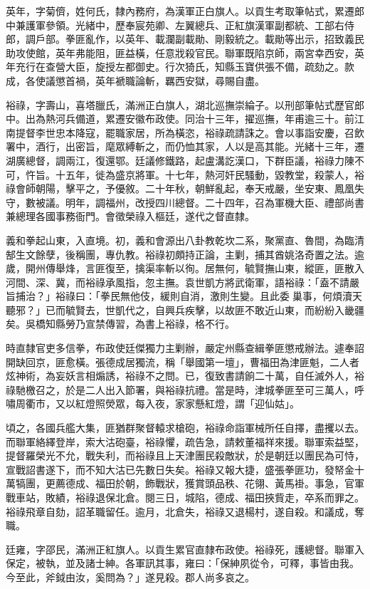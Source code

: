 \begin{pinyinscope}
英年，字菊儕，姓何氏，隸內務府，為漢軍正白旗人。以貢生考取筆帖式，累遷郎中兼護軍參領。光緒中，歷奉宸苑卿、左翼總兵、正紅旗漢軍副都統、工部右侍郎，調戶部。拳匪亂作，以英年、載瀾副載勛、剛毅統之。載勛等出示，招致義民助攻使館，英年弗能阻，匪益橫，任意戕殺官民。聯軍既陷京師，兩宮幸西安，英年充行在查營大臣，旋授左都御史。行次猗氏，知縣玉寶供張不備，疏劾之。款成，各使議懲首禍，英年褫職論斬，羈西安獄，尋賜自盡。

裕祿，字壽山，喜塔臘氏，滿洲正白旗人，湖北巡撫崇綸子。以刑部筆帖式歷官郎中。出為熱河兵備道，累遷安徽布政使。同治十三年，擢巡撫，年甫逾三十。前江南提督李世忠本降寇，罷職家居，所為橫恣，裕祿疏請誅之。會以事詣安慶，召飲署中，酒行，出密旨，麾眾縛斬之，而仍恤其家，人以是高其能。光緒十三年，遷湖廣總督，調兩江，復還鄂。廷議修鐵路，起盧溝訖漢口，下群臣議，裕祿力陳不可，忤旨。十五年，徙為盛京將軍。十七年，熱河奸民騷動，毀教堂，殺蒙人，裕祿會師朝陽，擊平之，予優敘。二十年秋，朝鮮亂起，奉天戒嚴，坐安東、鳳凰失守，數被議。明年，調福州，改授四川總督。二十四年，召為軍機大臣、禮部尚書兼總理各國事務衙門。會徵榮祿入樞廷，遂代之督直隸。

義和拳起山東，入直境。初，義和會源出八卦教乾坎二系，聚黨直、魯間，為臨清郜生文餘孽，後稱團，專仇教。裕祿初頗持正論，主剿，捕其酋姚洛奇置之法。逾歲，開州傳舉烽，言匪復至，擒渠率斬以徇。居無何，毓賢撫山東，縱匪，匪散入河間、深、冀，而裕祿承風指，忽主撫。袁世凱方將武衛軍，語裕祿：「盍不請嚴旨捕治？」裕祿曰：「拳民無他伎，緩則自消，激則生變。且此委巢事，何煩瀆天聽邪？」已而毓賢去，世凱代之，自興兵疾擊，以故匪不敢近山東，而紛紛入畿疆矣。吳橋知縣勞乃宣禁傳習，為書上裕祿，格不行。

時直隸官吏多信拳，布政使廷傑獨力主剿辦，嚴定州縣查緝拳匪懲戒辦法。遽奉詔開缺回京，匪愈橫。張德成居獨流，稱「舉國第一壇」，曹福田為津匪魁，二人者炫神術，為妄妖言相煽誘，裕祿不之問。已，復致書請餉二十萬，自任滅外人，裕祿馳檄召之，於是二人出入節署，與裕祿抗禮。當是時，津城拳匪至可三萬人，呼嘯周衢市，又以紅燈照熒眾，每入夜，家家懸紅燈，謂「迎仙姑」。

頃之，各國兵艦大集，匪猶群聚督轅求槍砲，裕祿命詣軍械所任自擇，盡攫以去。而聯軍絡繹登岸，索大沽砲臺，裕祿懼，疏告急，請敕董福祥來援。聯軍索益堅，提督羅榮光不允，戰失利，而裕祿且上天津團民殺敵狀，於是朝廷以團民為可恃，宣戰詔書遂下，而不知大沽已先數日失矣。裕祿又報大捷，盛張拳匪功，發帑金十萬犒團，更薦德成、福田於朝，飾戰狀，獲賞頭品秩、花翎、黃馬褂。事急，官軍戰車站，敗績，裕祿退保北倉。閱三日，城陷，德成、福田挾貲走，卒系而罪之。裕祿飛章自劾，詔革職留任。逾月，北倉失，裕祿又退楊村，遂自殺。和議成，奪職。

廷雍，字邵民，滿洲正紅旗人。以貢生累官直隸布政使。裕祿死，護總督。聯軍入保定，被執，並及諸士紳。各軍訊其事，雍曰：「保紳夙從令，可釋，事皆由我。今至此，斧鉞由汝，奚問為？」遂見殺。郡人尚多哀之。


\end{pinyinscope}
